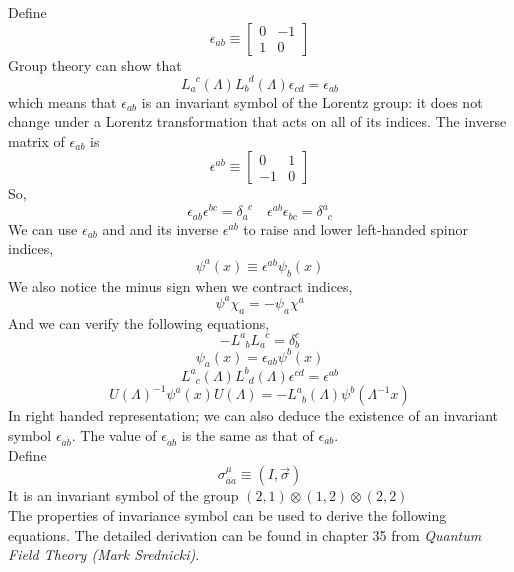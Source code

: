 \documentclass[cyan]{elegantnote}
\begin{document}
\noindent
Define
\[\epsilon_{ab} \equiv \left[ \begin{matrix} 0& -1\\ 1& 0\end{matrix} \right] \]
Group theory can show that
\[L_a^{\phantom{a}c}(\Lambda) L_b^{\phantom{b}d}(\Lambda) \epsilon_{cd} = \epsilon
_{ab}\]
which means that $\epsilon_{ab}$ is an invariant symbol of the Lorentz group: it does not change under a Lorentz transformation that acts on all of its indices. The inverse matrix of $\epsilon_{ab}$ is
\[\epsilon^{ab} \equiv \left[ \begin{matrix} 0& 1\\ -1& 0\end{matrix} \right] \]
So,
\[\epsilon_{ab}\epsilon^{bc} = \delta_a^{\phantom{a}c} \quad \epsilon^{ab}\epsilon_{bc} = \delta^a_{\phantom{a}c}\]
We can use $\epsilon_{ab}$ and and its inverse $\epsilon^{ab}$ to raise and lower left-handed spinor indices, 
\[\psi^a(x) \equiv \epsilon^{ab} \psi_b(x)\]
We also notice the minus sign when we contract indices,
\[\psi^a \chi_a = -\psi_a \chi^a\]
And we can verify the following equations,
\[-L^a_{\phantom{a}b} L_a^{\phantom{a}c} = \delta^c_b \]
\[\psi_a(x) = \epsilon_{ab} \psi^b(x)\]
\[L^a_{\phantom{a}c}(\Lambda) L^b_{\phantom{b}d}(\Lambda) \epsilon^{cd} = \epsilon
^{ab}\]
\[U(\Lambda)^{-1} \psi^a(x) U(\Lambda) = -L^a_{\phantom{a}b}(\Lambda) \psi^b(\Lambda^{-1}x)\]
In right handed representation; we can also deduce the existence of an invariant symbol $\epsilon_{\dot{a}\dot{b}}$. The value of $\epsilon_{\dot{a}\dot{b}}$ is the same as that of $\epsilon_{ab}$.\\
Define
\[\sigma^{\mu}_{a\dot{a}} \equiv (I,\vec{\sigma})\]
It is an invariant symbol of the group $(2,1) \otimes (1,2) \otimes (2,2)$
\\
The properties of invariance symbol can be used to derive the following equations. The detailed derivation can be found in chapter 35 from \emph{Quantum Field Theory (Mark Srednicki)}.
\end{document}
